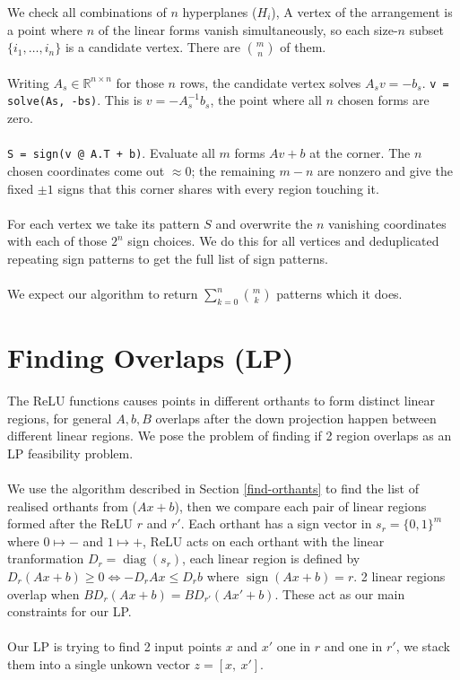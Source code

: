 \documentclass{article}
\begin{document}
We check all combinations of $n$ hyperplanes ($H_i$), A vertex of the arrangement is a point where $n$ of the linear forms vanish simultaneously, so each size-$n$ subset $\{i_1,\dots,i_n\}$ is a candidate vertex. There are $\binom{m}{n}$ of them.\\
\\
Writing $A_s\in\mathbb{R}^{n\times n}$ for those $n$ rows, the candidate vertex solves $A_s v=-b_s$. \texttt{v = solve(As, -bs)}. This is $v = -A_s^{-1}b_s$, the point where all $n$ chosen forms are zero.\\
\\
\texttt{S = sign(v @ A.T + b)}. Evaluate all $m$ forms $Av+b$ at the corner. The $n$ chosen coordinates come out $\approx 0$; the remaining $m-n$ are nonzero and give the fixed $\pm1$ signs that this corner shares with every region touching it.\\
\\
For each vertex we take its pattern $S$ and overwrite the $n$ vanishing coordinates with each of those $2^n$ sign choices. We do this for all vertices and deduplicated repeating sign patterns to get the full list of sign patterns.\\
\\
We expect our algorithm to return $\sum_{k=0}^{n}\binom{m}{k}$ patterns which it does. 


\section{Finding Overlaps (LP)} \label{distinct-pairs}
The ReLU functions causes points in different orthants to form distinct linear regions, for general $A,b,B$ overlaps after the down projection happen between different linear regions. We pose the problem of finding if 2 region overlaps as an LP feasibility problem.\\
\\
We use the algorithm described in Section \ref{find-orthants} to find the list of realised orthants from ($Ax+b$), then we compare each pair of linear regions formed after the ReLU $r$ and $r'$. Each orthant has a sign vector in $s_r=\{0, 1\}^m$ where $0\mapsto-$ and $1\mapsto+$, ReLU acts on each orthant with the linear tranformation $D_r=\operatorname{diag}(s_r)$, each linear region is defined by $D_r(Ax+b)\ge0\iff -D_rAx \le D_rb$ where $\operatorname{sign}(Ax+b)=r$. 2 linear regions overlap when $BD_r(Ax +b)=BD_{r'}(Ax'+b)$. These act as our main constraints for our LP.\\
\\
Our LP is trying to find 2 input points $x$ and $x'$ one in $r$ and one in $r'$, we stack them into a single unkown vector $z=[x,\  x']$.
\end{document}
